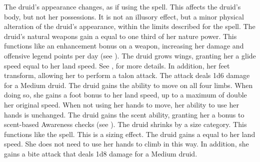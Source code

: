         The druid's appearance changes, as if using the  spell.
        This affects the druid's body, but not her possessions.
        It is not an illusory effect, but a minor physical alteration of the druid's appearance, within the limits described for the spell.
        The druid's natural weapons gain a  equal to one third of her nature power.
        This functions like an enhancement bonus on a weapon, increasing her damage and offensive legend points per day (see ).
        The druid grows wings, granting her a glide speed equal to her land speed.
        See , for more details.
        In addition, her feet transform, allowing her to perform a talon attack.
        The attack deals 1d6 damage for a Medium druid.
        The druid gains the ability to move on all four limbs.
        When doing so, she gains a  foot bonus to her land speed, up to a maximum of double her original speed.
        When not using her hands to move, her ability to use her hands is unchanged.
        The druid gains the scent ability, granting her a  bonus to scent-based Awareness checks (see ).
        The druid shrinks by a size category.
        This functions like the  spell.
        This is a sizing effect.
        The druid gains a  equal to her land speed.
        She does not need to use her hands to climb in this way.
        In addition, she gains a bite attack that deals 1d8 damage for a Medium druid.

